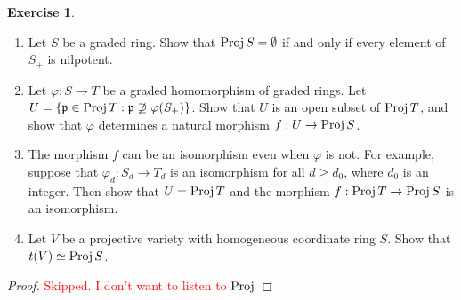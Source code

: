 \documentclass[]{pcmi}
\theoremstyle{plain}
\theoremstyle{definition}
\newtheorem{Exercise}{Exercise}
\theoremstyle{remark}
\begin{document}
\begin{Exercise}
    \phantom{h}
    \begin{enumerate}[label = (\alph*)]
        \item Let $S$ be a graded ring. Show that $\operatorname{Proj} S = \emptyset$ if and only if every element of $S_+$ is nilpotent. 
        \item Let $\varphi : S \to T$ be a graded homomorphism of graded rings. Let $U = \{\mathfrak{p} \in \operatorname{Proj} T : \mathfrak{p} \not \supseteq \varphi(S_+)\}$. Show that $U$ is an open subset of $\operatorname{Proj} T$, and show that $\varphi$ determines a natural morphism $f : U \to \operatorname{Proj} S$.
        \item The morphism $f$ can be an isomorphism even when $\varphi$ is not. For example, suppose that $\varphi_d : S_d \to T_d$ is an isomorphism for all $d \geq d_0$, where $d_0$ is an integer. Then show that $U = \operatorname{Proj} T$ and the morphism $f : \operatorname{Proj} T \to \operatorname{Proj} S$ is an isomorphism. 
        \item Let $V$ be a projective variety with homogeneous coordinate ring $S$. Show that $t(V) \simeq \operatorname{Proj} S$. 
    \end{enumerate}
\end{Exercise}

\begin{proof}
    \textcolor{red}{Skipped. I don't want to listen to $\operatorname{Proj}$}
\end{proof}
\end{document}
